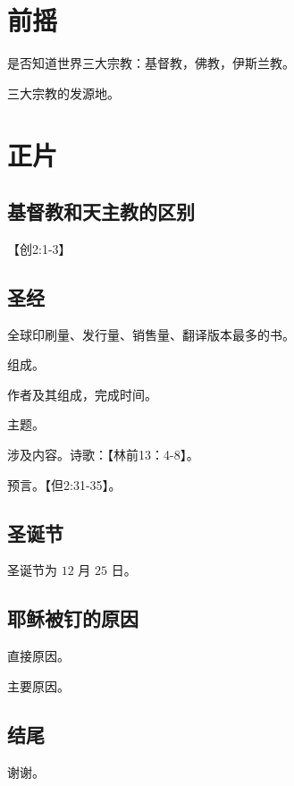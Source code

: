 \documentclass[11pt,a4paper,UTF8]{article}
\begin{document}
\section{前摇}
是否知道世界三大宗教：基督教，佛教，伊斯兰教。\par
三大宗教的发源地。\par
\section{正片}
\subsection{基督教和天主教的区别}
【创2:1-3】
\subsection{圣经}
全球印刷量、发行量、销售量、翻译版本最多的书。\par
组成。\par
作者及其组成，完成时间。\par
主题。\par
涉及内容。诗歌：【林前13：4-8】。\par
预言。【但2:31-35】。\par
\subsection{圣诞节}
圣诞节为 $12$ 月 $25$ 日。
\subsection{耶稣被钉的原因}
直接原因。\par
主要原因。\par
\subsection{结尾}
谢谢。
\end{document}
